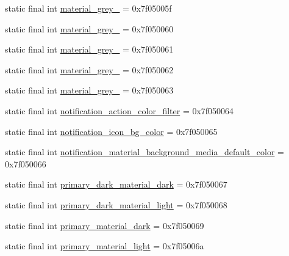 \begin{DoxyCompactItemize}
\item 
static final int \mbox{\hyperlink{classandroid_1_1support_1_1v7_1_1appcompat_1_1R_1_1color_a33981738bd67483e3c6c138e47c3083b}{material\+\_\+grey\+\_}} = 0x7f05005f
\item 
static final int \mbox{\hyperlink{classandroid_1_1support_1_1v7_1_1appcompat_1_1R_1_1color_a93899d56d62a17747075b6064ec99364}{material\+\_\+grey\+\_}} = 0x7f050060
\item 
static final int \mbox{\hyperlink{classandroid_1_1support_1_1v7_1_1appcompat_1_1R_1_1color_a754dcd0cbabaa0fb12f3b774f0394cd6}{material\+\_\+grey\+\_}} = 0x7f050061
\item 
static final int \mbox{\hyperlink{classandroid_1_1support_1_1v7_1_1appcompat_1_1R_1_1color_a2e6e9968a655a16317a5d332fa831f10}{material\+\_\+grey\+\_}} = 0x7f050062
\item 
static final int \mbox{\hyperlink{classandroid_1_1support_1_1v7_1_1appcompat_1_1R_1_1color_a6ec6c6585de5abf315a0289cbf5e3584}{material\+\_\+grey\+\_}} = 0x7f050063
\item 
static final int \mbox{\hyperlink{classandroid_1_1support_1_1v7_1_1appcompat_1_1R_1_1color_a070891da40cfe4de04b6d15085730cf8}{notification\+\_\+action\+\_\+color\+\_\+filter}} = 0x7f050064
\item 
static final int \mbox{\hyperlink{classandroid_1_1support_1_1v7_1_1appcompat_1_1R_1_1color_acddbdf164e38bf0f0635cda7060f6e53}{notification\+\_\+icon\+\_\+bg\+\_\+color}} = 0x7f050065
\item 
static final int \mbox{\hyperlink{classandroid_1_1support_1_1v7_1_1appcompat_1_1R_1_1color_a80b0577c8f85e47ec5cb5444552e9d0c}{notification\+\_\+material\+\_\+background\+\_\+media\+\_\+default\+\_\+color}} = 0x7f050066
\item 
static final int \mbox{\hyperlink{classandroid_1_1support_1_1v7_1_1appcompat_1_1R_1_1color_a6f3197ffaef2c0dc4af0f27aa444a0e3}{primary\+\_\+dark\+\_\+material\+\_\+dark}} = 0x7f050067
\item 
static final int \mbox{\hyperlink{classandroid_1_1support_1_1v7_1_1appcompat_1_1R_1_1color_abc7e36eaa8300f0592fdf83fd2cdb2bd}{primary\+\_\+dark\+\_\+material\+\_\+light}} = 0x7f050068
\item 
static final int \mbox{\hyperlink{classandroid_1_1support_1_1v7_1_1appcompat_1_1R_1_1color_a56f0defd568d11f4259dceccf4848b29}{primary\+\_\+material\+\_\+dark}} = 0x7f050069
\item 
static final int \mbox{\hyperlink{classandroid_1_1support_1_1v7_1_1appcompat_1_1R_1_1color_ad93abfea5fcbd22376aeea41048ee7c5}{primary\+\_\+material\+\_\+light}} = 0x7f05006a

\end{DoxyCompactItemize}
